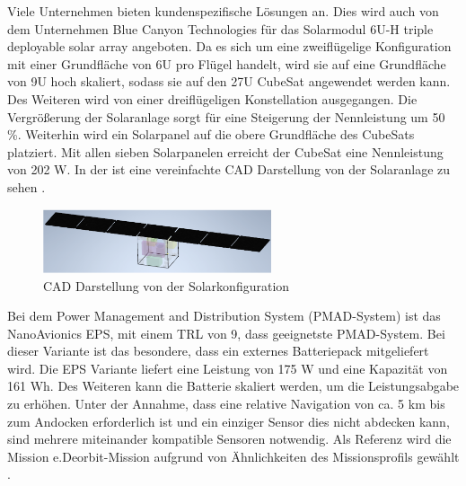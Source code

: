 				Viele Unternehmen bieten kundenspezifische Lösungen an. Dies wird auch von dem Unternehmen Blue Canyon Technologies für das Solarmodul 6U-H triple deployable solar array angeboten. Da es sich um eine zweiflügelige Konfiguration mit einer Grundfläche von 6U pro Flügel handelt, wird sie auf eine Grundfläche von 9U hoch skaliert, sodass sie auf  den 27U CubeSat angewendet werden kann. Des Weiteren wird von einer dreiflügeligen Konstellation ausgegangen. Die Vergrößerung der Solaranlage sorgt für eine Steigerung der Nennleistung um 50 \%. Weiterhin wird ein Solarpanel auf die obere Grundfläche des CubeSats platziert. Mit allen sieben Solarpanelen erreicht der CubeSat eine Nennleistung von 202 W. In der  ist eine vereinfachte CAD Darstellung von der Solaranlage zu sehen \cite{Lettau.}.
				\begin{figure}[!h]
					\centering
						\includegraphics[width=0.60\textwidth]{graphics/Solarpanel.PNG}
						\caption{CAD Darstellung von der Solarkonfiguration \cite{Lettau.}}
						\label{fig:solarpanel}
				\end{figure}
				Bei dem Power Management and Distribution System (PMAD-System) ist das NanoAvionics EPS, mit einem TRL von 9, dass geeignetste PMAD-System. Bei dieser Variante ist das besondere, dass ein externes Batteriepack mitgeliefert wird. Die EPS Variante liefert eine Leistung von 175 W und eine Kapazität von 161 Wh. Des Weiteren kann die Batterie skaliert werden, um die Leistungsabgabe zu erhöhen. Unter der Annahme, dass eine relative Navigation von ca. 5 km bis zum Andocken erforderlich ist und ein einziger Sensor dies nicht abdecken kann, sind mehrere miteinander kompatible Sensoren notwendig. Als Referenz wird die Mission e.Deorbit-Mission aufgrund von Ähnlichkeiten des Missionsprofils gewählt \cite{Lettau.}.  
				
